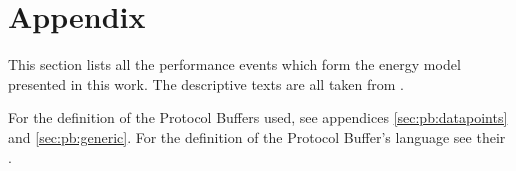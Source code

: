 \appendix
\appendixpage
\addappheadtotoc

\renewcommand\thesection{\Alph{section}}
\chapter{Appendix}

\label{appendix:chosen-events}

This section lists all the performance events which form the energy model
presented in this work. The descriptive texts are all taken from
\cite{intel2011events}.





\label{sec:fmt:datapoints}
For the definition of the Protocol Buffers used, see appendices
\ref{sec:pb:datapoints} and \ref{sec:pb:generic}. For the definition of the
Protocol Buffer's language see their
.



\label{sec:pb:datapoints}


\label{sec:pb:generic}


\label{sec:pb:datapoints}


\label{sec:pb:counter-files}

